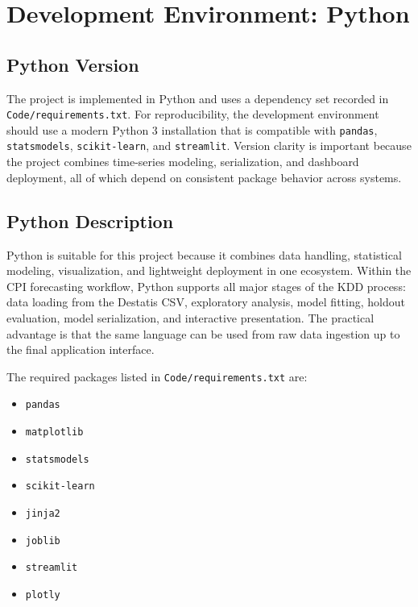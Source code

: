 %
%
%

\chapter{Development Environment: Python}
\label{ch:dev-env-python}

\section{Python Version}

The project is implemented in Python and uses a dependency set recorded in \texttt{Code/requirements.txt}. For reproducibility, the development environment should use a modern Python 3 installation that is compatible with \texttt{pandas}, \texttt{statsmodels}, \texttt{scikit-learn}, and \texttt{streamlit}. Version clarity is important because the project combines time-series modeling, serialization, and dashboard deployment, all of which depend on consistent package behavior across systems.

\section{Python Description}

Python is suitable for this project because it combines data handling, statistical modeling, visualization, and lightweight deployment in one ecosystem. Within the CPI forecasting workflow, Python supports all major stages of the KDD process: data loading from the Destatis CSV, exploratory analysis, model fitting, holdout evaluation, model serialization, and interactive presentation. The practical advantage is that the same language can be used from raw data ingestion up to the final application interface.

The required packages listed in \texttt{Code/requirements.txt} are:

\begin{itemize}
	\item \texttt{pandas}
	\item \texttt{matplotlib}
	\item \texttt{statsmodels}
	\item \texttt{scikit-learn}
	\item \texttt{jinja2}
	\item \texttt{joblib}
	\item \texttt{streamlit}
	\item \texttt{plotly}
\end{itemize}

